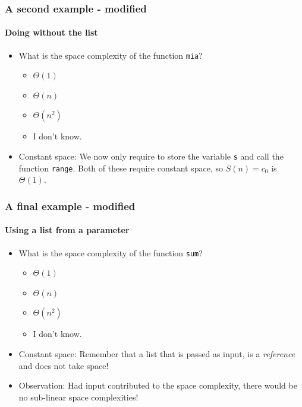 \begin{frame}
	\frametitle{A second example - modified}
	\framesubtitle{Doing without the list}
	

		
		
			\begin{itemize}
				\item What is the space complexity of the function \texttt{mia}?
			\begin{itemize}
				\item $\Theta(1)$
				\item $\Theta(n)$ 
				\item $\Theta(n^2)$
				\item I don't know.
			\end{itemize}
	
				\item Constant space:
		We now only require to store the variable \texttt{s} and call the function \texttt{range}. Both of these require
		constant space, so $S(n) = c_0$ is $\Theta(1)$.
	\end{itemize}
\end{frame}

\begin{frame}
	\frametitle{A final example - modified}
	\framesubtitle{Using a list from a parameter}
						\begin{itemize}
				\item What is the space complexity of the function \texttt{sum}?
			\begin{itemize}
				\item $\Theta(1)$
				\item $\Theta(n)$ 
				\item $\Theta(n^2)$
				\item I don't know.
			\end{itemize}
				\item Constant space:
		Remember that a list that is passed as input, is a \textit{reference} and does not take space!
				\item Observation:
			Had input contributed to the space complexity, there would be no sub-linear space complexities!	
		\end{itemize}	
		
				

\end{frame}


